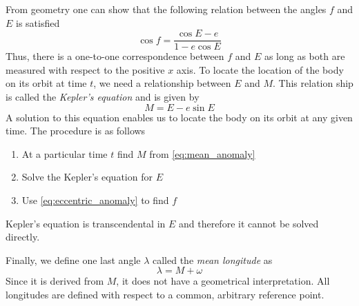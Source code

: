 \documentclass[twoside,openright,titlepage,numbers=noenddot,headinclude,%
                footinclude=true,cleardoublepage=empty,abstractoff, 
                BCOR=5mm,paper=a4,fontsize=11pt,%
                american,%
                ]{scrreprt}%
\begin{document}
From geometry one can show that the following relation between the
angles $f$ and $E$ is satisfied
\begin{equation}
    \cos f= \frac{\cos E -e}{1-e\cos E} 
    \label{eq:eccentric_anomaly}
\end{equation}
Thus, there is a one-to-one correspondence between $f$ and $E$ as long as
both are measured with respect to the positive $x$ axis. To 
locate the location of the body on its orbit at time $t$, we need
a relationship between $E$ and $M$. This relation ship is called
the \emph{Kepler's equation} and is given by \citep{murray}
\begin{equation}
    M=E-e\sin E
    \label{eq:kepler_equation}
\end{equation}
A solution to this equation enables us to locate the body on its orbit
at any given time. The procedure is as follows
\begin{enumerate}
    \item At a particular time $t$ find $M$ from \cref{eq:mean_anomaly}
    \item Solve the Kepler's equation for $E$
    \item Use \cref{eq:eccentric_anomaly} to find $f$
\end{enumerate}
Kepler's equation is transcendental in $E$ and therefore it cannot
be solved directly. 

Finally, we define one last angle $\lambda$ called the
\emph{mean longitude} as
\begin{equation}
    \lambda =M +\omega
\end{equation}
Since it is derived from $M$, it does not have a geometrical 
interpretation. All longitudes are defined with respect to a 
common, arbitrary reference point.
\end{document}
